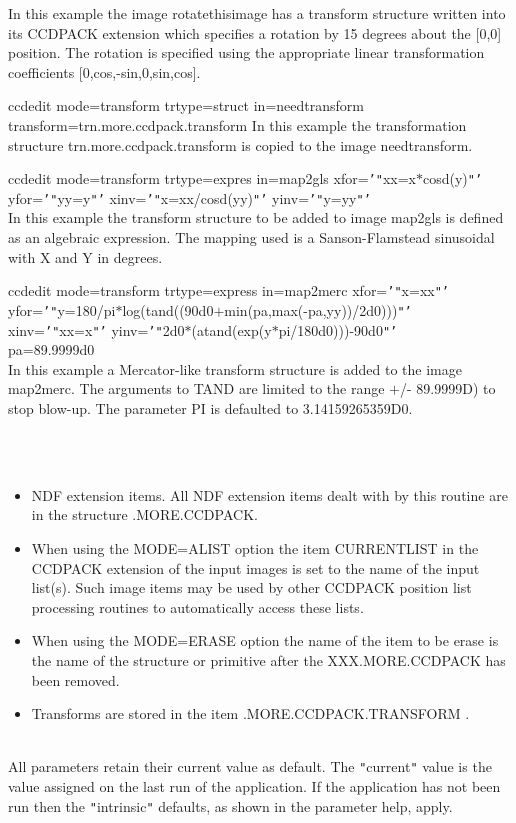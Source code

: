 \documentclass[twoside,11pt]{article}
\renewcommand{\_}{\texttt{\symbol{95}}}
\newcommand{\qt}[1]{{\tt "}#1{\tt "}}
\newcommand{\qs}[1]{{\tt '}#1{\tt '}}
\newcommand{\sstexamplesubsection}[2]{\sloppy \item{\ssttt #1} \mbox{} \\ #2 }
\newcommand{\sstnotes}[1]{\item[Notes:] \mbox{} \\[1.3ex] #1}
\newcommand{\sstdiytopic}[2]{\item[#1:] \mbox{} \\[1.3ex] #2}
\newcommand{\sstitemlist}[1]{
  \mbox{} \\
  \vspace{-3.5ex}
  \begin{itemize}
     #1
  \end{itemize}
}
\newcommand{\sstitem}{\item}
\newcommand{\sstexamplesubsection}[2]{\item[{\ssttt #1}] #2}
\newcommand{\sstnotes}[1]{\item[Notes:] #1 }
\newcommand{\sstdiytopic}[2]{\item[{#1}] #2 }
\newcommand{\sstitemlist}[1]{
      \begin{itemize}
         #1
      \end{itemize}
      \\
   }
\newcommand{\sstitem}{\item}
\begin{document}
{{{      }{
         In this example the image rotate\_this\_image has a transform
         structure written into its CCDPACK extension which specifies a
         rotation by 15 degrees about the [0,0] position. The rotation
         is specified using the appropriate linear transformation
         coefficients [0,cos,-sin,0,sin,cos].
      }
      \sstexamplesubsection{
         ccdedit mode=transform trtype=struct in=need\_transform
      }{
              transform=trn.more.ccdpack.transform
         In this example the transformation structure
         trn.more.ccdpack.transform is copied to the image need\_transform.
      }
      \sstexamplesubsection{
         ccdedit mode=transform trtype=expres in=map2gls
              xfor=\qs{\qt{xx=x$*$cosd(y)}} yfor=\qs{\qt{yy=y}}
              xinv=\qs{\qt{x=xx/cosd(yy)}}
              yinv=\qs{\qt{y=yy}}
      }{
         In this example the transform structure to be added to image
         map2gls is defined as an algebraic expression. The mapping used
         is a Sanson-Flamstead sinusoidal with X and Y in degrees.
      }
      \sstexamplesubsection{
         ccdedit mode=transform trtype=express in=map2merc
              xfor=\qs{\qt{x=xx}}
yfor=\qs{\qt{y=180/pi$*$log(tand((90d0$+$min(pa,max(-pa,yy))/2d0)))}}
              xinv=\qs{\qt{xx=x}}
yinv=\qs{\qt{2d0$*$(atand(exp(y$*$pi/180d0)))-90d0}} \\
              pa=89.9999d0
      }{
         In this example a Mercator-like transform structure is added to
         the image map2merc. The arguments to TAND are limited to the
         range $+$/- 89.9999D) to stop blow-up. The parameter PI is
         defaulted to 3.14159265359D0.
      }
   }
   \sstnotes{
      \sstitemlist{

         \sstitem
         NDF extension items.
            All NDF extension items dealt with by this routine are in the
            structure .MORE.CCDPACK.

         \sstitem
         When using the MODE=ALIST option the item CURRENT\_LIST in the
           CCDPACK extension of the input images is set to the name of the
           input list(s). Such image items may be used by other CCDPACK
           position list processing routines to automatically access
           these lists.

         \sstitem
         When using the MODE=ERASE option the name of the item to be
           erase is the name of the structure or primitive after the
           XXX.MORE.CCDPACK has been removed.

         \sstitem
         Transforms are stored in the item .MORE.CCDPACK.TRANSFORM .
      }
   }
   \sstdiytopic{
      Behaviour of parameters
   }{
      All parameters retain their current value as default. The
      \qt{current} value is the value assigned on the last run of the
      application. If the application has not been run then the
      \qt{intrinsic} defaults, as shown in the parameter help, apply.

}}
\end{document}
